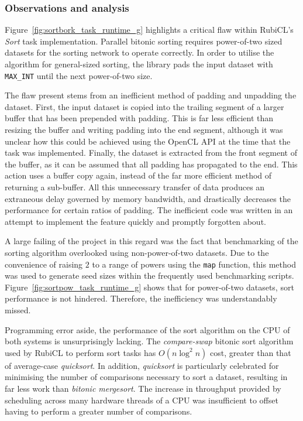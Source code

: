 \subsubsection{Observations and analysis}
Figure~\ref{fig:sortbork_task_runtime_g} highlights a critical flaw within RubiCL's \emph{Sort} task implementation.
Parallel bitonic sorting requires power-of-two sized datasets for the sorting network to operate correctly. In order to utilise the algorithm for general-sized sorting, the library pads the input dataset with \verb|MAX_INT| until the next power-of-two size.

The flaw present stems from an inefficient method of padding and unpadding the dataset. First, the input dataset is copied into the trailing segment of a larger buffer that has been prepended with padding. This is far less efficient than resizing the buffer and writing padding into the end segment, although it was unclear how this could be achieved using the \ac{OpenCL} \ac{API} at the time that the task was implemented. Finally, the dataset is extracted from the front segment of the buffer, as it can be assumed that all padding has propagated to the end. This action uses a buffer copy again, instead of the far more efficient method of returning a sub-buffer. All this unnecessary transfer of data produces an extraneous delay governed by memory bandwidth, and drastically decreases the performance for certain ratios of padding. The inefficient code was written in an attempt to implement the feature quickly and promptly forgotten about.

A large failing of the project in this regard was the fact that benchmarking of the sorting algorithm overlooked using non-power-of-two datasets. Due to the convenience of raising $2$ to a range of powers using the \verb|map| function, this method was used to generate seed sizes within the frequently used benchmarking scripts. Figure~\ref{fig:sortpow_task_runtime_g} shows that for power-of-two datasets, sort performance is not hindered. Therefore, the inefficiency was understandably missed.

Programming error aside, the performance of the sort algorithm on the \ac{CPU} of both systems is unsurprisingly lacking.
The \emph{compare-swap} bitonic sort algorithm used by RubiCL to perform sort tasks has $O(n \log^2 n)$ cost, greater than that of average-case \emph{quicksort}.
In addition, \emph{quicksort} is particularly celebrated for minimising the number of comparisons necessary to sort a dataset, resulting in far less work than \emph{bitonic mergesort}.
The increase in throughput provided by scheduling across many hardware threads of a \ac{CPU} was insufficient to offset having to perform a greater number of comparisons.

